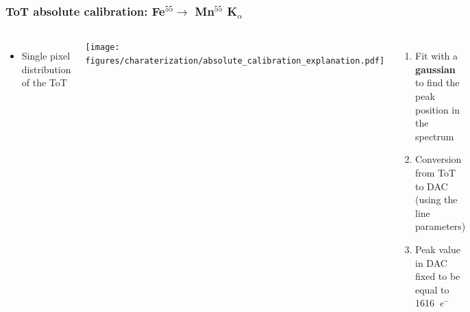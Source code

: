     \begin{frame}
        \frametitle{ToT absolute calibration: Fe$^{55} \rightarrow$ Mn$^{55}$ K$_{\alpha}$}
        \begin{columns}
            \centering
            \begin{itemize}
                \item Single pixel distribution of the ToT
            \end{itemize}
                \hspace*{+0.3cm}\texttt{[image: figures/charaterization/absolute\_calibration\_explanation.pdf]}
            \vspace*{2.5cm} 
            \begin{enumerate}
                \item Fit with a \textbf{gaussian} to find the peak position in the spectrum
                \item Conversion from ToT to DAC (using the line parameters)
                \item Peak value in DAC fixed to be equal to \SI{1616}{\elementarycharge}$^-$
            \end{enumerate} 
        \end{columns}
    \end{frame}     



